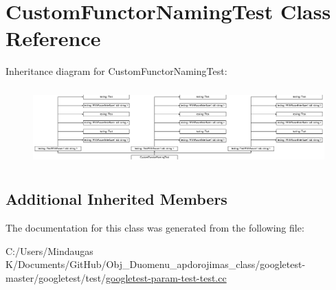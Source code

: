 \hypertarget{class_custom_functor_naming_test}{}\section{Custom\+Functor\+Naming\+Test Class Reference}
\label{class_custom_functor_naming_test}
Inheritance diagram for Custom\+Functor\+Naming\+Test\+:\begin{figure}[H]
\begin{center}
\leavevmode
\includegraphics[height=2.998662cm]{d0/d4d/class_custom_functor_naming_test}
\end{center}
\end{figure}
\subsection*{Additional Inherited Members}


The documentation for this class was generated from the following file\+:\begin{DoxyCompactItemize}
\item 
C\+:/\+Users/\+Mindaugas K/\+Documents/\+Git\+Hub/\+Obj\+\_\+\+Duomenu\+\_\+apdorojimas\+\_\+class/googletest-\/master/googletest/test/\mbox{\hyperlink{googletest-master_2googletest_2test_2googletest-param-test-test_8cc}{googletest-\/param-\/test-\/test.\+cc}}\end{DoxyCompactItemize}
